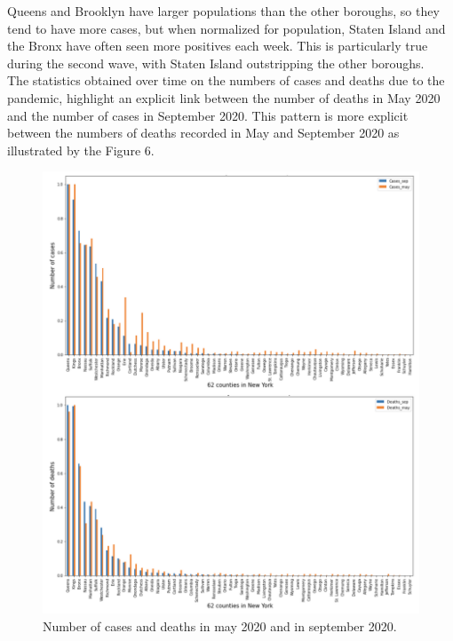 \documentclass{article}
\begin{document}
Queens and Brooklyn have larger populations than the other boroughs, so they tend to have more cases, but when normalized for population, Staten Island and the Bronx have often seen more positives each week. This is particularly true during the second wave, with Staten Island outstripping the other boroughs.\\


The statistics obtained over time on the numbers of cases and deaths due to the pandemic, highlight an explicit link between the number of deaths in May 2020 and the number of  cases in September 2020.   This pattern is more explicit between the numbers of  deaths recorded in May and September 2020 as illustrated by the  Figure 6. 
\begin{figure}[h!]
 \centering
\includegraphics[width=1.06\textwidth]{compare4.png}
  \caption{Number of cases and deaths in may 2020 and in september 2020.}
\end{figure}
\end{document}
